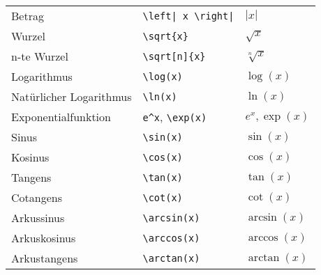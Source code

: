 \begin{longtable}{l l l}
    \midrule
    Betrag                    & \texttt{\textbackslash left| x \textbackslash right|}                                   & $ \left| x \right| $                 \\
    Wurzel                    & \texttt{\textbackslash sqrt\{x\}}                                                       & $ \sqrt{x} $                         \\
    n-te Wurzel               & \texttt{\textbackslash sqrt[n]\{x\}}                                                    & $ \sqrt[n]{x} $                      \\
    Logarithmus               & \texttt{\textbackslash log{(x)}}                                                        & $ \log{(x)} $                        \\
    Natürlicher Logarithmus   & \texttt{\textbackslash ln{(x)}}                                                         & $ \ln{(x)} $                         \\
    Exponentialfunktion       & \texttt{e\^{}x}, \texttt{\textbackslash exp{(x)}}                                       & $ e^x, \exp{(x)} $                   \\

    \midrule
    Sinus                     & \texttt{\textbackslash sin{(x)}}                                                        & $ \sin{(x)} $                        \\
    Kosinus                   & \texttt{\textbackslash cos{(x)}}                                                        & $ \cos{(x)} $                        \\
    Tangens                   & \texttt{\textbackslash tan{(x)}}                                                        & $ \tan{(x)} $                        \\
    Cotangens                 & \texttt{\textbackslash cot{(x)}}                                                        & $ \cot{(x)} $                        \\
    Arkussinus                & \texttt{\textbackslash arcsin{(x)}}                                                     & $ \arcsin{(x)} $                     \\
    Arkuskosinus              & \texttt{\textbackslash arccos{(x)}}                                                     & $ \arccos{(x)} $                     \\
    Arkustangens              & \texttt{\textbackslash arctan{(x)}}                                                     & $ \arctan{(x)} $                     \\


\end{longtable}
